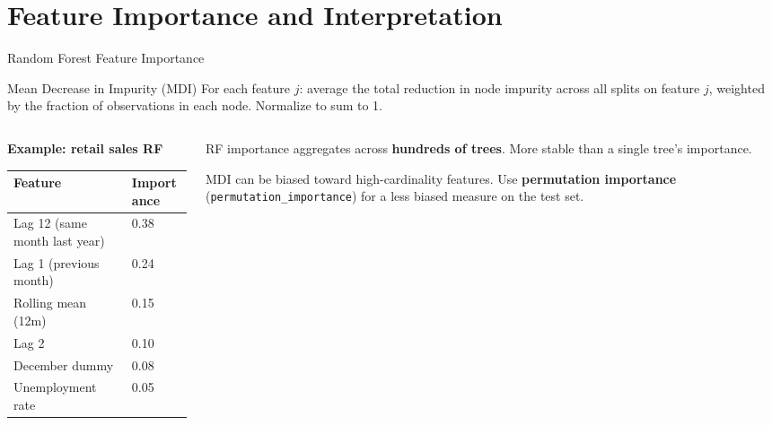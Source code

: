 \documentclass[aspectratio=169, 11pt]{beamer}
\begin{document}
\section{Feature Importance and Interpretation}


\begin{frame}{Random Forest Feature Importance \parencite{Molnar2022}}
  \begin{definitionbox}{Mean Decrease in Impurity (MDI)}
    \small For each feature $j$: average the total reduction in node impurity
    across all splits on feature $j$, weighted by the fraction of observations
    in each node. Normalize to sum to 1.
  \end{definitionbox}
  \begin{columns}[T]
    \begin{column}{0.52\textwidth}
      \textbf{Example: retail sales RF}
      \begin{center}
        {\small
        \begin{tabular}{ll}
          \toprule
          \textbf{Feature} & \textbf{Importance} \\
          \midrule
          Lag 12 (same month last year) & 0.38 \\
          Lag 1 (previous month)        & 0.24 \\
          Rolling mean (12m)            & 0.15 \\
          Lag 2                          & 0.10 \\
          December dummy                 & 0.08 \\
          Unemployment rate              & 0.05 \\
          \bottomrule
        \end{tabular}
        }
      \end{center}
    \end{column}
    \begin{column}{0.44\textwidth}
      \begin{keybox}
        \small RF importance aggregates across \textbf{hundreds of trees}.
        More stable than a single tree's importance.
      \end{keybox}
      \begin{warningbox}
        \small MDI can be biased toward high-cardinality features.
        Use \textbf{permutation importance}
        (\texttt{permutation\_importance}) for a less biased
        measure on the test set.
      \end{warningbox}
    \end{column}
  \end{columns}
\end{frame}
\end{document}
